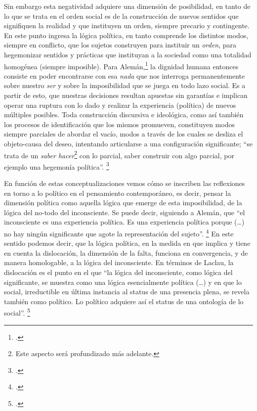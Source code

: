 Sin embargo esta negatividad adquiere una dimensión de posibilidad, en tanto de lo que se trata en el orden social es de la construcción de nuevos sentidos que signifiquen la realidad y que instituyen un orden, siempre precario y contingente. En este punto ingresa la lógica política, en tanto comprende los distintos modos, siempre en conflicto, que los sujetos construyen para instituir un \emph{orden}, para hegemonizar sentidos y prácticas que instituyan a la sociedad como una totalidad homogénea (siempre imposible). Para Alemán,\footcite[][]{@7108-ALEMAN2010} la dignidad humana entonces consiste en poder encontrarse con esa \emph{nada} que nos interroga permanentemente sobre nuestro \emph{ser} y sobre la imposibilidad que se juega en todo lazo social. Es a partir de esto, que nuestras decisiones resultan apuestas sin garantías e implican operar una ruptura con lo dado y realizar la experiencia (política) de nuevos múltiples posibles. Toda construcción discursiva e ideológica, como así también los procesos de identificación que los mismos promueven, constituyen modos siempre parciales de abordar el vacío, modos a través de los cuales se desliza el objeto-causa del deseo, intentando articularse a una configuración significante; \enquote{se trata de un \emph{saber hacer}\footnote{Este aspecto será profundizado más adelante.} con lo parcial, saber construir con algo parcial, por ejemplo una hegemonía política}. \footcite[][49]{@7108-ALEMAN2010}

En función de estas conceptualizaciones vemos cómo se inscriben las reflexiones en torno a lo político en el pensamiento contemporáneo, es decir, pensar la dimensión política como aquella lógica que emerge de esta imposibilidad, de la lógica del no-todo del inconsciente. Se puede decir, siguiendo a Alemán, que \enquote{el inconsciente es una experiencia política. Es una experiencia política porque (\ldots) no hay ningún significante que agote la representación del sujeto}. \footcite[][171]{@7109-ALEMAN2006} En este sentido podemos decir, que la lógica política, en la medida en que implica y tiene en cuenta la dislocación, la dimensión de la falta, funciona en convergencia, y de manera homologable, a la lógica del inconsciente. En términos de Laclau, la dislocación es el punto en el que \enquote{la lógica del inconsciente, como lógica del significante, se muestra como una lógica esencialmente política (\ldots) y en que lo social, irreductible en última instancia al status de una presencia plena, se revela también como político. Lo político adquiere así el status de una ontología de lo social}. \footcite[][110]{@6999-LACLAU1990}



